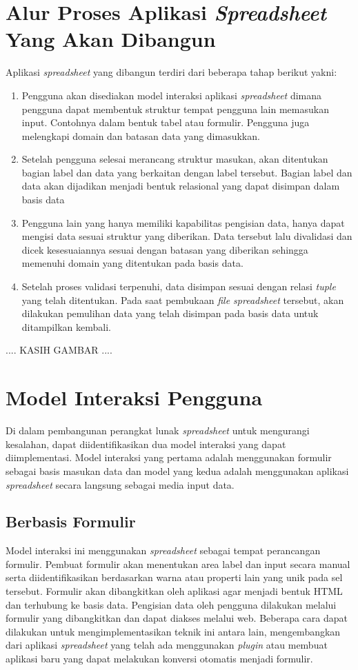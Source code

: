\section{Alur Proses Aplikasi \textit{Spreadsheet} Yang Akan Dibangun}
Aplikasi \textit{spreadsheet} yang dibangun terdiri dari beberapa tahap berikut yakni:
\begin{enumerate}
	\item Pengguna akan disediakan model interaksi aplikasi \textit{spreadsheet} dimana pengguna dapat membentuk struktur tempat pengguna lain memasukan input. Contohnya dalam bentuk tabel atau formulir. Pengguna juga melengkapi domain dan batasan data yang dimasukkan.
	\item Setelah pengguna selesai merancang struktur masukan, akan ditentukan bagian label dan data yang berkaitan dengan label tersebut. Bagian label dan data akan dijadikan menjadi bentuk relasional yang dapat disimpan dalam basis data
	\item Pengguna lain yang hanya memiliki kapabilitas pengisian data, hanya dapat mengisi data sesuai struktur yang diberikan. Data tersebut lalu divalidasi dan dicek kesesuaiannya sesuai dengan batasan yang diberikan sehingga memenuhi domain yang ditentukan pada basis data.
	\item Setelah proses validasi terpenuhi, data disimpan sesuai dengan relasi \textit{tuple} yang telah ditentukan. Pada saat pembukaan \textit{file spreadsheet} tersebut, akan dilakukan pemulihan data yang telah disimpan pada basis data untuk ditampilkan kembali.
\end{enumerate}

.... KASIH GAMBAR .... 

\section{Model Interaksi Pengguna}
Di dalam pembangunan perangkat lunak \textit{spreadsheet} untuk mengurangi kesalahan, dapat diidentifikasikan dua model interaksi yang dapat diimplementasi. Model interaksi yang pertama adalah menggunakan formulir sebagai basis masukan data dan model yang kedua adalah menggunakan aplikasi \textit{spreadsheet} secara langsung sebagai media input data.
	\subsection{Berbasis Formulir}
	Model interaksi ini menggunakan \textit{spreadsheet} sebagai tempat perancangan formulir. Pembuat formulir akan menentukan area label dan input secara manual serta diidentifikasikan berdasarkan warna atau properti lain yang unik pada sel tersebut. Formulir akan dibangkitkan oleh aplikasi agar menjadi bentuk HTML dan terhubung ke basis data. Pengisian data oleh pengguna dilakukan melalui formulir yang dibangkitkan dan dapat diakses melalui web. Beberapa cara dapat dilakukan untuk mengimplementasikan teknik ini antara lain, mengembangkan dari aplikasi \textit{spreadsheet} yang telah ada menggunakan \textit{plugin} atau membuat aplikasi baru yang dapat melakukan konversi otomatis menjadi formulir.

